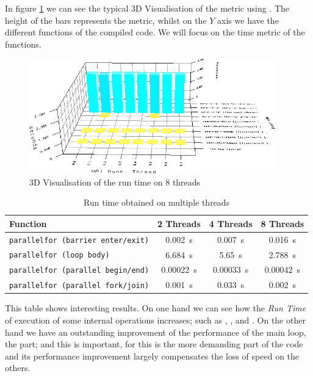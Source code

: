 In figure \ref{fig:paraprof-example} we can see the typical 3D Visualisation of the  metric using . The height of the bars represents the metric, whilst on the $Y$ axis we have the different functions of the compiled code. We will focus on the time metric of the  functions.

\begin{figure}[H]
	\centering
	\includegraphics[width=0.95\textwidth]{images/paraprof-example}
	\caption{3D Visualisation of the run time on 8 threads}
	\label{fig:paraprof-example}
\end{figure}

\begin{table}[H]
\centering
\begin{tabular}{l c c c}
    \toprule
    \toprule
    \textbf{Function} & \textbf{2 Threads} & \textbf{4 Threads} & \textbf{8 Threads} \\
    \midrule
    \texttt{parallelfor (barrier enter/exit)} & \SI{0.002}{\s} & \SI{0.007}{\s} & \SI{0.016}{\s} \\
    \texttt{parallelfor (loop body)}          & \SI{6.684}{\s} & \SI{5.65}{\s} & \SI{2.788}{\s} \\
    \texttt{parallelfor (parallel begin/end)} & \SI{0.00022}{\s} & \SI{0.00033}{\s} & \SI{0.00042}{\s} \\
    \texttt{parallelfor (parallel fork/join)} & \SI{0.001}{\s} & \SI{0.033}{\s} & \SI{0.002}{\s} \\
    \bottomrule
\end{tabular}
\caption{Run time obtained on multiple threads}
\label{my-label}
\end{table}

This table shows interesting results. On one hand we can see how the \emph{Run Time} of execution of some internal operations increases; such as , , and . On the other hand we have an outstanding improvement of the performance of the main loop, the  part; and this is important, for this is the more demanding part of the code and its performance improvement largely compensates the loss of speed on the others.



